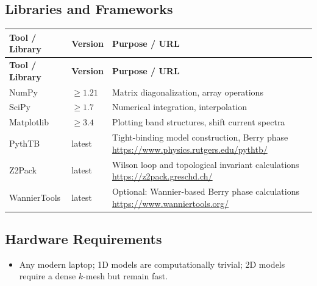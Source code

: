 \documentclass[11pt,a4paper]{article}
\begin{document}
\subsection{Libraries and Frameworks}
\begin{longtable}{p{4.5cm} p{2.5cm} p{6.5cm}}
\toprule
\textbf{Tool / Library} & \textbf{Version} & \textbf{Purpose / URL} \\
\midrule
\endfirsthead
\toprule
\textbf{Tool / Library} & \textbf{Version} & \textbf{Purpose / URL} \\
\midrule
\endhead
NumPy & $\geq 1.21$ & Matrix diagonalization, array operations \\
\midrule
SciPy & $\geq 1.7$ & Numerical integration, interpolation \\
\midrule
Matplotlib & $\geq 3.4$ & Plotting band structures, shift current spectra \\
\midrule
PythTB & latest & Tight-binding model construction, Berry phase \newline \url{https://www.physics.rutgers.edu/pythtb/} \\
\midrule
Z2Pack & latest & Wilson loop and topological invariant calculations \newline \url{https://z2pack.greschd.ch/} \\
\midrule
WannierTools & latest & Optional: Wannier-based Berry phase calculations \newline \url{https://www.wanniertools.org/} \\
\bottomrule
\end{longtable}

\subsection{Hardware Requirements}
\begin{itemize}
  \item Any modern laptop; 1D models are computationally trivial; 2D models require a dense $k$-mesh but remain fast.
\end{itemize}
\end{document}
